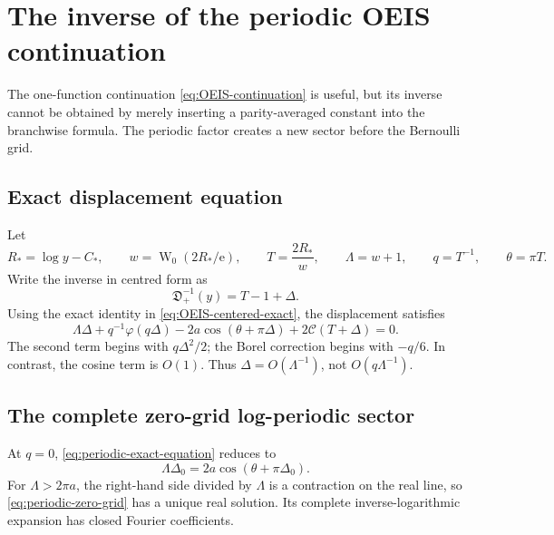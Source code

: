 \documentclass[11pt,a4paper,oneside]{article}
\theoremstyle{plain}
\theoremstyle{definition}
\theoremstyle{remark}
\newcommand{\e}{\mathrm e}
\newcommand{\W}{\operatorname W}
\newcommand{\DO}{\mathfrak D}
\begin{document}
\section{The inverse of the periodic OEIS continuation}
\label{sec:periodic-inverse}

The one-function continuation \cref{eq:OEIS-continuation} is useful, but its
inverse cannot be obtained by merely inserting a parity-averaged constant into
the branchwise formula.  The periodic factor creates a new sector before the
Bernoulli grid.

\subsection{Exact displacement equation}

Let
\begin{equation}
 R_*=\log y-C_*,
 \qquad w=\W_0(2R_*/\e),
 \qquad T=\frac{2R_*}{w},
 \qquad \Lambda=w+1,
 \qquad q=T^{-1},
 \qquad \theta=\pi T.
 \label{eq:periodic-core}
\end{equation}
Write the inverse in centred form as
\begin{equation}
 \DO_+^{-1}(y)=T-1+\Delta.
 \label{eq:periodic-inverse-displacement}
\end{equation}
Using the exact identity in \cref{eq:OEIS-centered-exact}, the displacement
satisfies
\begin{equation}
 \Lambda\Delta+q^{-1}\varphi(q\Delta)
 -2a\cos(\theta+\pi\Delta)
 +2\mathcal C(T+\Delta)=0.
 \label{eq:periodic-exact-equation}
\end{equation}
The second term begins with $q\Delta^2/2$; the Borel correction begins with
$-q/6$.  In contrast, the cosine term is $O(1)$.  Thus
$\Delta=O(\Lambda^{-1})$, not $O(q\Lambda^{-1})$.

\subsection{The complete zero-grid log-periodic sector}

At $q=0$, \cref{eq:periodic-exact-equation} reduces to
\begin{equation}
 \Lambda\Delta_0=2a\cos(\theta+\pi\Delta_0).
 \label{eq:periodic-zero-grid}
\end{equation}
For $\Lambda>2\pi a$, the right-hand side divided by $\Lambda$ is a
contraction on the real line, so \cref{eq:periodic-zero-grid} has a unique real
solution.  Its complete inverse-logarithmic expansion has closed Fourier
coefficients.
\end{document}

